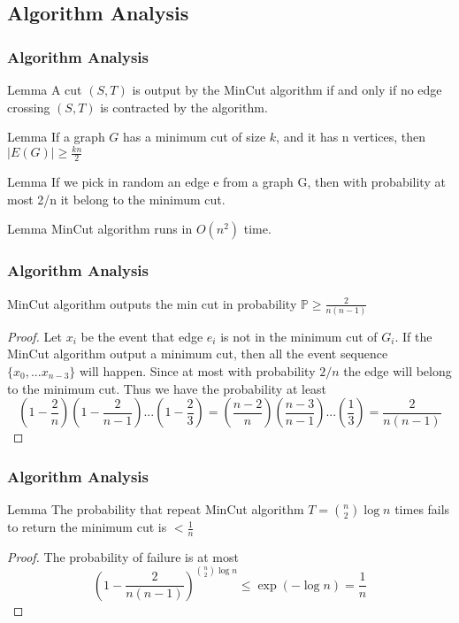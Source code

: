 \documentclass[compress,blue]{beamer}
\begin{document}
	\subsection{Algorithm Analysis}
	\begin{frame}[c]
	\frametitle{Algorithm Analysis}
	
	\begin{block}{Lemma}
	A cut $ (S,T) $ is output by the MinCut algorithm if and only if no edge crossing $ (S,T) $ is contracted by the algorithm.
	\end{block}
	\pause
	\begin{block}{Lemma}
	If a graph $ G $ has a minimum cut of size $ k $, and it has n vertices, then $ |E(G)|\geq \frac{kn}{2} $
	\end{block}
	\pause
	\begin{block}{Lemma}
	If we pick in random an edge e from a graph G, then with probability at most 2/n it belong to the minimum cut.
	\end{block}
	\pause
	\begin{block}{Lemma}
	MinCut algorithm runs in $ O(n^2) $ time.
	\end{block}
	\end{frame}
	
	\begin{frame}[c]
	\frametitle{Algorithm Analysis}
	\begin{theorem}
	MinCut algorithm outputs the min cut in probability $ \mathbb{P}\geq \frac{2}{n(n-1)} $
	\end{theorem}
	\begin{proof}
	Let $ x_i $ be the event that edge $ e_i $ is not in the minimum cut of $ G_i $. If the MinCut algorithm output a minimum cut, then all the event sequence $ \{ x_0,...x_{n-3} \} $ will happen. Since at most with probability $ 2/n $ the edge will belong to the minimum cut. Thus we have the probability at least \[ (1-\frac{2}{n})(1-\frac{2}{n-1})...(1-\frac{2}{3})=(\frac{n-2}{n})(\frac{n-3}{n-1})...(\frac{1}{3})=\frac{2}{n(n-1)} \]
	\end{proof}
	\end{frame}
	
	\begin{frame}[c]
	\frametitle{Algorithm Analysis}
	\begin{block}{Lemma}
	The probability that repeat MinCut algorithm $ T={n \choose 2}\log n $ times fails to return the minimum cut is $ <\frac{1}{n} $
	\end{block}
	\begin{proof}
	The probability of failure is at most\[  (1-\frac{2}{n(n-1)} )^{{n \choose 2}\log n} \leq  \exp(-\log n)=\frac{1}{n} \]
	\end{proof}
	\end{frame}
	
\end{document}

